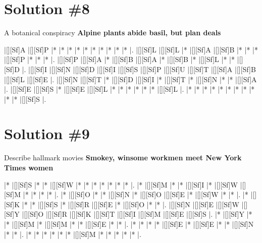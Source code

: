\documentclass[letterpaper]{article}
\begin{document}
\newpage
\section*{Solution \#8}
A botanical conspiracy
\newline\textbf{Alpine plants abide basil, but plan deals}

\vspace*{1em}
\begin{Puzzle}{12}{7}
|[][Sf]A  |[][Sf]P  |*        |*        |*        |*        |*        |*        |*        |*        |*        |*        |.  
|[][Sf]L  |[][Sf]L  |*        |[][Sf]A  |[][Sf]B  |*        |*        |*        |[][Sf]P  |*        |*        |*        |.
|[][Sf]P  |[][Sf]A  |*        |[][Sf]B  |[][Sf]A  |*        |[][Sf]B  |*        |[][Sf]L  |*        |*        |[][Sf]D  |.  
|[][Sf]I  |[][Sf]N  |[][Sf]D  |[][Sf]I  |[][Sf]S  |[][Sf]P  |[][Sf]U  |[][Sf]T  |[][Sf]A  |[][Sf]B  |[][Sf]L  |[][Sf]E  |.
|[][Sf]N  |[][Sf]T  |*        |[][Sf]D  |[][Sf]I  |*        |[][Sf]T  |*        |[][Sf]N  |*        |*        |[][Sf]A  |. 
|[][Sf]E  |[][Sf]S  |*        |[][Sf]E  |[][Sf]L  |*        |*        |*        |*        |*        |*        |[][Sf]L  |.
|*        |*        |*        |*        |*        |*        |*        |*        |*        |*        |*        |[][Sf]S  |.
\end{Puzzle}

\newpage
\section*{Solution \#9}
Describe hallmark movies
\newline\textbf{Smokey, winsome workmen meet New York Times women}

\vspace*{1em}
\begin{Puzzle}{12}{8}
|*        |[][Sf]S  |*        |*        |[][Sf]W  |*        |*        |*        |*        |*        |*        |*        |.
|*        |[][Sf]M  |*        |*        |[][Sf]I  |*        |[][Sf]W  |[][Sf]M  |*        |*        |*        |*        |.
|*        |[][Sf]O  |*        |*        |[][Sf]N  |*        |[][Sf]O  |[][Sf]E  |*        |[][Sf]W  |*        |*        |.
|*        |[][Sf]K  |*        |*        |[][Sf]S  |*        |[][Sf]R  |[][Sf]E  |*        |[][Sf]O  |*        |*        |.
|[][Sf]N  |[][Sf]E  |[][Sf]W  |[][Sf]Y  |[][Sf]O  |[][Sf]R  |[][Sf]K  |[][Sf]T  |[][Sf]I  |[][Sf]M  |[][Sf]E  |[][Sf]S  |.
|*        |[][Sf]Y  |*        |*        |[][Sf]M  |*        |[][Sf]M  |*        |*        |[][Sf]E  |*        |*        |.
|*        |*        |*        |*        |[][Sf]E  |*        |[][Sf]E  |*        |*        |[][Sf]N  |*        |*        |.
|*        |*        |*        |*        |*        |*        |[][Sf]M  |*        |*        |*        |*        |*        |.
\end{Puzzle}
\end{document}
